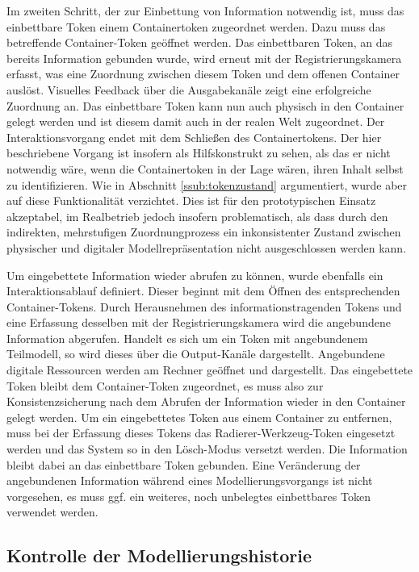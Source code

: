 Im zweiten Schritt, der zur Einbettung von Information notwendig ist, muss das einbettbare Token einem Containertoken zugeordnet werden. Dazu muss das betreffende Container-Token geöffnet werden. Das einbettbaren Token, an das bereits Information gebunden wurde, wird erneut mit der Registrierungskamera erfasst, was eine Zuordnung zwischen diesem Token und dem offenen Container auslöst. Visuelles Feedback über die Ausgabekanäle zeigt eine erfolgreiche Zuordnung an. Das einbettbare Token kann nun auch physisch in den Container gelegt werden und ist diesem damit auch in der realen Welt zugeordnet. Der Interaktionsvorgang endet mit dem Schließen des Containertokens. Der hier beschriebene Vorgang ist insofern als Hilfskonstrukt zu sehen, als das er nicht notwendig wäre, wenn die Containertoken in der Lage wären, ihren Inhalt selbst zu identifizieren. Wie in Abschnitt \ref{ssub:tokenzustand} argumentiert, wurde aber auf diese Funktionalität verzichtet. Dies ist für den prototypischen Einsatz akzeptabel, im Realbetrieb jedoch insofern problematisch, als dass durch den indirekten, mehrstufigen Zuordnungprozess ein inkonsistenter Zustand zwischen physischer und digitaler Modellrepräsentation nicht ausgeschlossen werden kann.

Um eingebettete Information wieder abrufen zu können, wurde ebenfalls ein Interaktionsablauf definiert. Dieser beginnt mit dem Öffnen des entsprechenden Container-Tokens. Durch Herausnehmen des informationstragenden Tokens und eine Erfassung desselben mit der Registrierungskamera wird die angebundene Information abgerufen. Handelt es sich um ein Token mit angebundenem Teilmodell, so wird dieses über die Output-Kanäle dargestellt. Angebundene digitale Ressourcen werden am Rechner geöffnet und dargestellt. Das eingebettete Token bleibt dem Container-Token zugeordnet, es muss also zur Konsistenzsicherung nach dem Abrufen der Information wieder in den Container gelegt werden. Um ein eingebettetes Token aus einem Container zu entfernen, muss bei der Erfassung dieses Tokens das Radierer-Werkzeug-Token eingesetzt werden und das System so in den Lösch-Modus versetzt werden. Die Information bleibt dabei an das einbettbare Token gebunden. Eine Veränderung der angebundenen Information während eines Modellierungsvorgangs ist nicht vorgesehen, es muss ggf. ein weiteres, noch unbelegtes einbettbares Token verwendet werden. 


\subsection{Kontrolle der Modellierungshistorie} %
\label{sub:kontrolle_der_modellierungshistorie}

